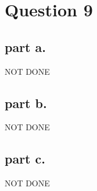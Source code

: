 \section{Question 9}

\subsection{part a.}
NOT DONE

\subsection{part b.}
NOT DONE
\subsection{part c.}
NOT DONE
